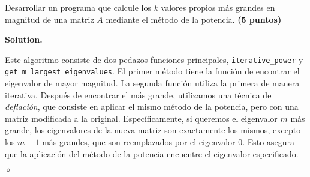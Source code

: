 \documentclass{article}
\theoremstyle{problemstyle}
\newenvironment{solution}{%
  \begin{mdframed}[linewidth=0.8pt,linecolor=Gray,backgroundcolor=Gray!5,roundcorner=5pt]%
  \noindent\textbf{Solution.}%
}{%
\hfill $ \diamond $ 
  \end{mdframed}%
}
\begin{document}
\begin{problem}
Desarrollar un programa que calcule los $ k $ valores propios m\'as grandes en magnitud de
una matriz $ A $ mediante el m\'etodo de la potencia. \textbf{(5 puntos)}
\end{problem}

\begin{solution}
	Este algoritmo consiste de dos pedazos funciones principales,
	\texttt{iterative\_power} y \texttt{get\_m\_largest\_eigenvalues}. El primer
	m\'etodo tiene la funci\'on de encontrar el eigenvalor de mayor magnitud. La
	segunda funci\'on utiliza la primera de manera iterativa. Despu\'es de
	encontrar el m\'as grande, utilizamos una t\'ecnica de \textit{deflaci\'on},
	que consiste en aplicar el mismo m\'etodo de la potencia, pero con una matriz
	modificada a la original. Espec\'ificamente, si queremos el eigenvalor $ m $
	m\'as grande, los eigenvalores de la nueva matriz son exactamente los mismos,
	excepto los $ m-1 $ m\'as grandes, que son reemplazados por el eigenvalor 0.
	Esto asegura que la aplicaci\'on del m\'etodo de la potencia encuentre el
	eigenvalor especificado.



\end{solution}
\end{document}
